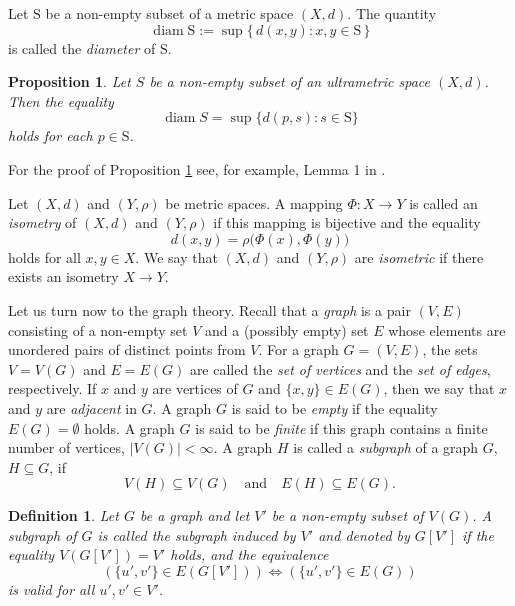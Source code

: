 \documentclass{raex}
\newtheorem{defn}[thm]{Definition}
\newtheorem{prop}[thm]{Proposition}
\theoremstyle{definition}
\theoremstyle{remark}
\numberwithin{equation}{section}
\begin{document}
Let $\mathrm{S} $ be a non-empty subset of a metric space $(X,d)$. The quantity
\[
\operatorname{diam}\mathrm{S}
:= \sup\{\, d(x,y) : x,y \in \mathrm{S} \,\}
\]
is called the {\it diameter} of $\mathrm{S}$.



\begin{prop}\label{xxtt}
 Let $S$ be a non-empty subset of an
ultrametric space $(X,d)$. Then the equality
\[
\operatorname{diam} S=\sup\{d(p,s):s\in \mathrm{S}\}
\]
holds for each $p\in \mathrm{S}$.
\end{prop}

For the proof of Proposition \ref{xxtt} see, for example, Lemma 1 in \cite{DR2026MDPI}.












Let $(X,d)$ and $(Y,\rho)$ be metric spaces. A mapping 
\(
\Phi : X \to Y
\)
is called an {\it isometry} of $(X,d)$ and $(Y,\rho)$ if this mapping is bijective and the equality
\[
d(x,y)=\rho\bigl(\Phi(x),\Phi(y)\bigr)
\]
holds for all $x,y\in X$.
We say that $(X,d)$ and $(Y,\rho)$ are {\it isometric} if there exists an isometry $X \to Y$.


Let us turn now to the graph theory.
  Recall that a {\it graph} is a pair $(V,E)$ consisting of a non-empty set $V$ and a (possibly empty) set $E$ whose elements are unordered pairs of distinct points from $V$.
For a graph $G=(V,E)$, the sets $V=V(G)$ and $E=E(G)$ are called the {\it set of vertices} and the {\it set of edges}, respectively. If $x$ and $y$ are vertices of $G$ and $\{x,y\}\in E(G)$, then we say that $x$ and $y$ are {\it adjacent} in $G$. A graph $G$ is said to be {\it empty} if the equality $E(G)=\emptyset$ holds. 
A graph $G$ is said to be {\it finite} if this graph contains a finite number of vertices, $|V(G)| < \infty$.
A graph $H$ is called a {\it subgraph} of a graph $G$, $H \subseteq G$, if 
\[
V(H) \subseteq V(G) \quad \text{and} \quad E(H) \subseteq E(G).
\] 


\begin{defn}
    \label{nnvv}
 Let $G$ be a graph and let $V'$ be a non-empty
subset of $V(G)$. A subgraph of $G$ is called the subgraph
induced by $V'$ and denoted by $G[V']$ if the equality
\(
V(G[V']) = V'
\)
holds, and the equivalence
\[
\left(\{u',v'\} \in E(G[V']) \right) \iff
\left(\{u',v'\} \in E(G)\right)
\]
is valid for all $u',v' \in V'$.
\end{defn}
\end{document}
